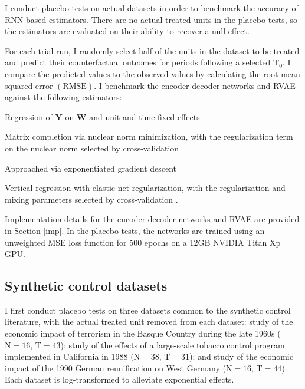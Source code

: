 I conduct placebo tests on actual datasets in order to benchmark the accuracy of RNN-based estimators. There are no actual treated units in the placebo tests, so the estimators are evaluated on their ability to recover a null effect. 

For each trial run, I randomly select half of the units in the dataset to be treated and predict their counterfactual outcomes for periods following a selected $\text{T}_0$. I compare the predicted values to the observed values by calculating the root-mean squared error $(\text{RMSE})$. I benchmark the encoder-decoder networks and RVAE against the following estimators: 
%
\begin{description}
	{\setlength\itemindent{1mm}
		\item[(a) DID] Regression of $\textbf{Y}$ on $\textbf{W}$ and unit and time fixed effects
		\item[(b) MC-NNM] Matrix completion via nuclear norm minimization, with the regularization term on the nuclear norm selected by cross-validation \citep{athey2017matrix}
		\item[(c) SCM] Approached via exponentiated gradient descent \citep{abadie2010synthetic}
		\item[(d) VT-EN] Vertical regression with elastic-net regularization, with the regularization and mixing parameters selected by cross-validation \citep{zou2005regularization,athey2017matrix}.
	}
\end{description}

Implementation details for the encoder-decoder networks and RVAE are provided in Section \ref{imp}. In the placebo tests, the networks are trained using an unweighted MSE loss function for 500 epochs on a 12GB NVIDIA Titan Xp GPU.

\subsection{Synthetic control datasets} \label{synth-placebo}

I first conduct placebo tests on three datasets common to the synthetic control literature, with the actual treated unit removed from each dataset:  study of the economic impact of terrorism in the Basque Country during the late 1960s ($\text{N}=16$, $\text{T}=43$);  study of the effects of a large-scale tobacco control program implemented in California in 1988 ($\text{N}=38$, $\text{T}=31$); and  study of the economic impact of the 1990 German reunification on West Germany ($\text{N}=16$, $\text{T}=44$). Each dataset is log-transformed to alleviate exponential effects.

